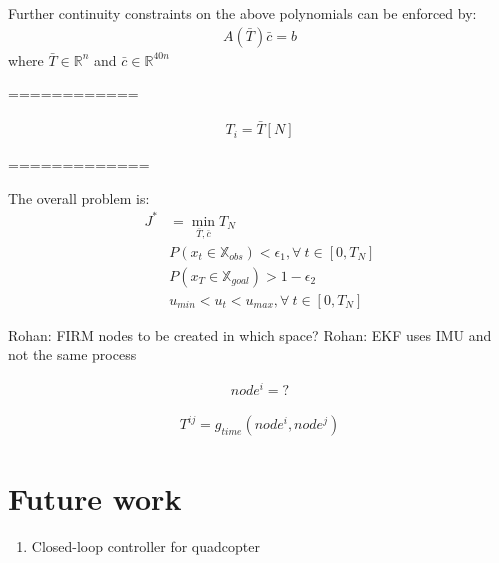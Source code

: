 \documentclass[conference]{IEEEtran}
\newcommand{\rohan}[1]{{\color{blue} Rohan: #1}}
\begin{document}
Further continuity constraints on the above polynomials can be enforced by:
\begin{align}
A(\bar{T}) \bar{c} = b    
\end{align}
where $\bar{T}\in\mathbb{R}^n$ and $\bar{c}\in \mathbb{R}^{40n}$

============

\begin{align}
T_i = \bar{T}[N]
\end{align}


=============


 The overall problem is:
\begin{align}
J^{*} &= \min_{\bar{T},\bar{c}} T_N\\
\nonumber & P(x_t\in \mathbb{X}_{obs}) < \epsilon_1, \forall~t \in [0,T_N]\\
\nonumber & P(x_T\in \mathbb{X}_{goal}) > 1-\epsilon_2 \\
\nonumber & u_{min} < u_t < u_{max}, \forall~t \in [0,T_N]
\end{align}

\rohan{FIRM nodes to be created in which space?}
\rohan{EKF uses IMU and not the same process}


\begin{align}
node^i = ?
\end{align}

\begin{align}
T^{ij} = g_{time}(node^i,node^j)
\end{align}

\section{Future work}
\begin{enumerate}
    \item Closed-loop controller for quadcopter
\end{enumerate}

\printbibliography
\end{document}
